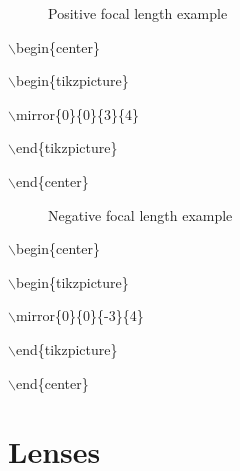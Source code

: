 \documentclass[12pt]{article}
\begin{document}
\begin{minipage}{\textwidth}
\begin{minipage}{0.5\textwidth}

\begin{figure}[H]

\begin{center}


\end{center}

\caption{Positive focal length example}
\end{figure}

$\backslash$begin\{center\}

$\backslash$begin\{tikzpicture\}

$\backslash$mirror\{0\}\{0\}\{3\}\{4\}

$\backslash$end\{tikzpicture\}

$\backslash$end\{center\}
\end{minipage}
\begin{minipage}{0.5\textwidth}

\begin{figure}[H]

\begin{center}


\end{center}

\caption{Negative focal length example}
\end{figure}

$\backslash$begin\{center\}

$\backslash$begin\{tikzpicture\}

$\backslash$mirror\{0\}\{0\}\{-3\}\{4\}

$\backslash$end\{tikzpicture\}

$\backslash$end\{center\}
\end{minipage}
\end{minipage}

\section{Lenses}
\end{document}
